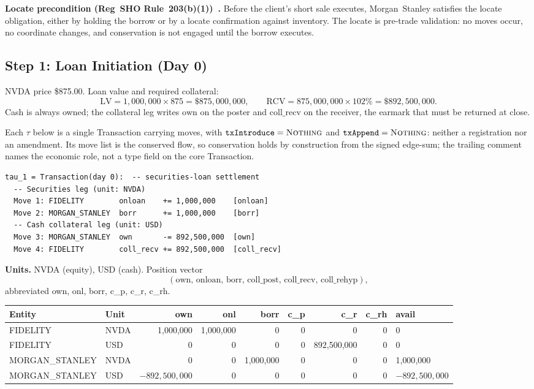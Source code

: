 \medskip
\noindent\textbf{Locate precondition (Reg~SHO Rule~203(b)(1))~\cite{regsho}.} Before the client's short sale executes, Morgan~Stanley satisfies the locate obligation, either by holding the borrow or by a locate confirmation against inventory. The locate is pre-trade validation: no moves occur, no coordinate changes, and conservation is not engaged until the borrow executes.

\subsection{Step 1: Loan Initiation (Day 0)}
\label{sec:us-step1}

NVDA price \$875.00. Loan value and required collateral:
\[
\mathrm{LV} = 1{,}000{,}000 \times 875 = \$875{,}000{,}000, \qquad
\mathrm{RCV} = 875{,}000{,}000 \times 102\% = \$892{,}500{,}000.
\]
Cash is always owned; the collateral leg writes $\mathrm{own}$ on the poster and $\mathrm{coll\_recv}$ on the receiver, the earmark that must be returned at close.

\noindent Each $\tau$ below is a single Transaction carrying moves, with $\mathtt{txIntroduce}=\textsc{Nothing}$ and $\mathtt{txAppend}=\textsc{Nothing}$: neither a registration nor an amendment. Its move list is the conserved flow, so conservation holds by construction from the signed edge-sum; the trailing comment names the economic role, not a type field on the core Transaction.

\begin{lstlisting}
tau_1 = Transaction(day 0):  -- securities-loan settlement
  -- Securities leg (unit: NVDA)
  Move 1: FIDELITY        onloan    += 1,000,000    [onloan]
  Move 2: MORGAN_STANLEY  borr      += 1,000,000    [borr]
  -- Cash collateral leg (unit: USD)
  Move 3: MORGAN_STANLEY  own       -= 892,500,000  [own]
  Move 4: FIDELITY        coll_recv += 892,500,000  [coll_recv]
\end{lstlisting}

\noindent\textbf{Units.} NVDA (equity), USD (cash). Position vector
\[(\mathrm{own},\,\mathrm{onloan},\,\mathrm{borr},\,\mathrm{coll\_post},\,\mathrm{coll\_recv},\,\mathrm{coll\_rehyp}),\]
abbreviated own, onl, borr, c\_p, c\_r, c\_rh.

\begin{center}\footnotesize\setlength{\tabcolsep}{4pt}
\begin{tabular}{l l r r r r r r l}
\toprule
\textbf{Entity} & \textbf{Unit} & own & onl & borr & c\_p & c\_r & c\_rh & avail \\
\midrule
FIDELITY & NVDA & 1{,}000{,}000 & 1{,}000{,}000 & 0 & 0 & 0 & 0 & 0 \\
FIDELITY & USD & 0 & 0 & 0 & 0 & 892{,}500{,}000 & 0 & 0 \\
\midrule
MORGAN\_STANLEY & NVDA & 0 & 0 & 1{,}000{,}000 & 0 & 0 & 0 & 1{,}000{,}000 \\
MORGAN\_STANLEY & USD & $-892{,}500{,}000$ & 0 & 0 & 0 & 0 & 0 & $-892{,}500{,}000$ \\
\bottomrule
\end{tabular}
\end{center}

